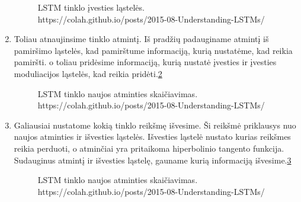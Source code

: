 \begin{enumerate}
\begin{figure}[h!]
\caption{LSTM tinklo įvesties ląstelės.\\https://colah.github.io/posts/2015-08-Understanding-LSTMs/}
\label{fig:lstminput}
\end{figure}
\item Toliau atnaujinsime tinklo atmintį. Iš pradžių padauginame atmintį iš pamiršimo ląstelės, kad pamirštume informaciją, kurią nustatėme, kad reikia pamiršti. o toliau pridėsime informaciją, kurią nustatė įvesties ir įvesties moduliacijos ląstelės, kad reikia pridėti.\ref{fig:lstmnewc}
\begin{figure}[h!]
  \centering
{}
\caption{LSTM tinklo naujos atminties skaičiavimas.\\https://colah.github.io/posts/2015-08-Understanding-LSTMs/}
\label{fig:lstmnewc}
\end{figure}
\item Galiausiai nustatome kokią tinklo reikšmę išvesime. Ši reikšmė priklausys nuo naujos atminties ir išvesties ląstelės. Išvesties ląstelė nustato kurias reikšmes reikia perduoti, o atminčiai yra pritaikoma hiperbolinio tangento funkcija. Sudauginus atmintį ir išvesties ląstelę, gauname kurią informaciją išvesime.\ref{fig:lstmoutput}
\begin{figure}[h!]
  \centering
{}
\caption{LSTM tinklo naujos atminties skaičiavimas.\\https://colah.github.io/posts/2015-08-Understanding-LSTMs/}
\label{fig:lstmoutput}
\end{figure}
\end{enumerate}

